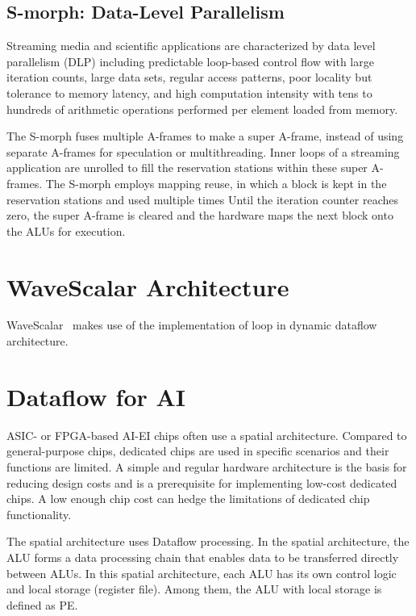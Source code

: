 \documentclass[UTF8,12pt,a4paper]{article}
\begin{document}
\subsection{S-morph: Data-Level Parallelism}
Streaming media and scientific applications are characterized by data level parallelism (DLP)
including predictable loop-based control flow with large iteration counts,
large data sets, regular access patterns, poor locality but tolerance to memory latency,
and high computation intensity with tens to hundreds of arithmetic operations performed per element loaded from memory.

The S-morph fuses multiple A-frames to make a super A-frame,
instead of using separate A-frames for speculation or multithreading.
Inner loops of a streaming application are unrolled
to fill the reservation stations within these super A-frames.
The S-morph employs mapping reuse, in which a block is kept in the reservation stations and used multiple times
Until the iteration counter reaches zero, the super A-frame is cleared
and the hardware maps the next block onto the ALUs for execution.

\clearpage

\section{WaveScalar Architecture}

WaveScalar~\cite{DBLP:conf/micro/SwansonMSO03}\cite{DBLP:journals/tocs/SwansonSMPPMOE07}
makes use of the implementation of loop in dynamic dataflow architecture.

\clearpage

\section{Dataflow for AI}

ASIC- or FPGA-based AI-EI chips often use a spatial architecture.
Compared to general-purpose chips, dedicated chips are used
in specific scenarios and their functions are limited.
A simple and regular hardware architecture is the basis for reducing design costs
and is a prerequisite for implementing low-cost dedicated chips.
A low enough chip cost can hedge the limitations of dedicated chip functionality.

The spatial architecture uses Dataflow processing.
In the spatial architecture, the ALU forms a data processing chain
that enables data to be transferred directly between ALUs.
In this spatial architecture, each ALU has its own control logic and local storage (register file).
Among them, the ALU with local storage is defined as PE.
\end{document}

